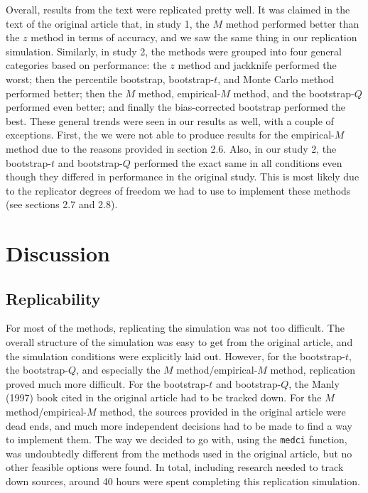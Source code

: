 \documentclass[10,a4paperpaper,]{article}
\begin{document}
Overall, results from the text were replicated pretty well. It was
claimed in the text of the original article that, in study 1, the \(M\)
method performed better than the \(z\) method in terms of accuracy, and
we saw the same thing in our replication simulation. Similarly, in study
2, the methods were grouped into four general categories based on
performance: the \(z\) method and jackknife performed the worst; then
the percentile bootstrap, bootstrap-\(t\), and Monte Carlo method
performed better; then the \(M\) method, empirical-\(M\) method, and the
bootstrap-\(Q\) performed even better; and finally the bias-corrected
bootstrap performed the best. These general trends were seen in our
results as well, with a couple of exceptions. First, the we were not
able to produce results for the empirical-\(M\) method due to the
reasons provided in section 2.6. Also, in our study 2, the
bootstrap-\(t\) and bootstrap-\(Q\) performed the exact same in all
conditions even though they differed in performance in the original
study. This is most likely due to the replicator degrees of freedom we
had to use to implement these methods (see sections 2.7 and 2.8).

\FloatBarrier
\section{Discussion}

\subsection{Replicability}

For most of the methods, replicating the simulation was not too
difficult. The overall structure of the simulation was easy to get from
the original article, and the simulation conditions were explicitly laid
out. However, for the bootstrap-\(t\), the bootstrap-\(Q\), and
especially the \(M\) method/empirical-\(M\) method, replication proved
much more difficult. For the bootstrap-\(t\) and bootstrap-\(Q\), the
Manly (1997) book cited in the original article had to be tracked down.
For the \(M\) method/empirical-\(M\) method, the sources provided in the
original article were dead ends, and much more independent decisions had
to be made to find a way to implement them. The way we decided to go
with, using the \texttt{medci} function, was undoubtedly different from
the methods used in the original article, but no other feasible options
were found. In total, including research needed to track down sources,
around 40 hours were spent completing this replication simulation.
\end{document}
